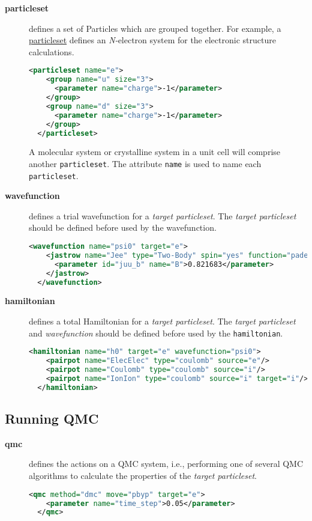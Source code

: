 \begin{description}
\item[\textbf{particleset}{}]
defines a set of Particles which are grouped together.  For example, a
\hyperlink{particleset.element}{particleset} defines an \emph{N-{}}electron
system for the electronic structure calculations.
 
\begin{lstlisting}[language=XML,emph={particleset},emphstyle=\bfseries\color{blue}]
  <particleset name="e">
    <group name="u" size="3">
      <parameter name="charge">-1</parameter>
    </group>
    <group name="d" size="3">
      <parameter name="charge">-1</parameter>
    </group>
  </particleset> 
\end{lstlisting}
A molecular system or crystalline system in a unit cell will comprise another
\texttt{particleset}.  The attribute \texttt{name} is used to name each
\texttt{particleset}.
 
\item[\textbf{wavefunction}{}]\label{wavefuncion.intro}
defines a trial wavefunction for a \emph{target particleset}.  The \emph{target
particleset} should be defined before used by the wavefunction.
 
\begin{lstlisting}[language=XML,emph={wavefunction},emphstyle=\bfseries\color{blue}]
  <wavefunction name="psi0" target="e">
    <jastrow name="Jee" type="Two-Body" spin="yes" function="pade">
      <parameter id="juu_b" name="B">0.821683</parameter>
    </jastrow>
  </wavefunction> 
\end{lstlisting}

\item[\textbf{hamiltonian}{}]
defines a total Hamiltonian for a \emph{target particleset}. The \emph{target
particleset}  and \emph{wavefunction} should be defined before used by the
\texttt{hamiltonian}.
 
\begin{lstlisting}[language=XML,emph={hamiltonian},emphstyle=\bfseries\color{blue}]
  <hamiltonian name="h0" target="e" wavefunction="psi0">
    <pairpot name="ElecElec" type="coulomb" source="e"/>
    <pairpot name="Coulomb" type="coulomb" source="i"/>
    <pairpot name="IonIon" type="coulomb" source="i" target="i"/>
  </hamiltonian> 
\end{lstlisting}
\end{description}

\subsection{Running  QMC}

\begin{description}
\item[\textbf{qmc}{}]
defines the actions on a QMC system, i.e., performing one of several QMC algorithms
to calculate the properties of the \emph{target particleset}.
 
\begin{lstlisting}[language=XML,emph={qmc},emphstyle=\bfseries\color{blue}]
  <qmc method="dmc" move="pbyp" target="e">
    <parameter name="time_step">0.05</parameter>
  </qmc> \end{lstlisting}
\end{description}
